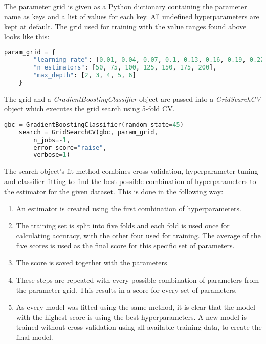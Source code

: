 The parameter grid is given as a Python dictionary containing the parameter name as keys and a list of values for
each key. All undefined hyperparameters are kept at default.
The grid used for training with the value ranges found above looks like this:

\begin{lstlisting}[language=Python]
    param_grid = {
        "learning_rate": [0.01, 0.04, 0.07, 0.1, 0.13, 0.16, 0.19, 0.22, 0.25],
        "n_estimators": [50, 75, 100, 125, 150, 175, 200],
        "max_depth": [2, 3, 4, 5, 6]
    }
\end{lstlisting}

The grid and a \emph{GradientBoostingClassifier} object are passed into a \emph{GridSearchCV} object
which executes the grid search using 5-fold CV.

\begin{lstlisting}[language=Python]
    gbc = GradientBoostingClassifier(random_state=45)    
    search = GridSearchCV(gbc, param_grid,
        n_jobs=-1,
        error_score="raise",
        verbose=1)
\end{lstlisting}

The search object's fit method combines cross-validation, hyperparameter tuning and classifier
fitting to find the best possible combination of hyperparameters to the estimator for the given dataset.
This is done in the following way:

\begin{enumerate}
    \item An estimator is created using the first combination of hyperparameters.
    \item The training set is split into five folds and each fold is used once for calculating accuracy,
    with the other four used for training. The average of the five scores is used as the final score for
    this specific set of parameters.
    \item The score is saved together with the parameters
    \item These steps are repeated with every possible combination of parameters from the 
    parameter grid. This results in a score for every set of parameters.
    \item As every model was fitted using the same method, it is clear that the model with the highest
    score is using the best hyperparameters. A new model is trained without cross-validation using all
    available training data, to create the final model.
\end{enumerate}

